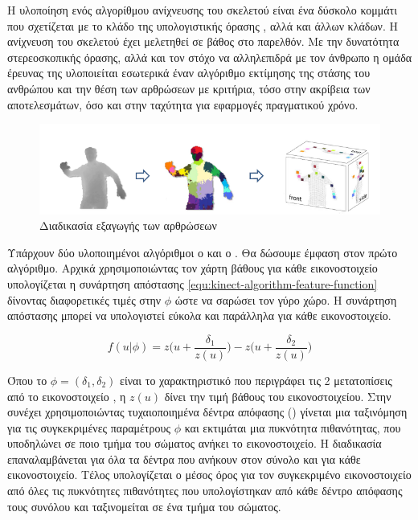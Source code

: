Η υλοποίηση ενός αλγορίθμου ανίχνευσης του σκελετού είναι ένα δύσκολο κομμάτι που σχετίζεται με το κλάδο της υπολογιστικής όρασης \cite{mubarak97}, αλλά και άλλων κλάδων. Η ανίχνευση του σκελετού έχει μελετηθεί σε βάθος \cite{moseslund01, poppe07} στο παρελθόν. Με την δυνατότητα στερεοσκοπικής όρασης, αλλά και τον στόχο να αλληλεπιδρά με τον άνθρωπο η ομάδα έρευνας της  υλοποιείται εσωτερικά έναν αλγόριθμο εκτίμησης της στάσης του ανθρώπου και την θέση των αρθρώσεων \cite{shotton11} με κριτήρια, τόσο στην ακρίβεια των αποτελεσμάτων, όσο και στην ταχύτητα για εφαρμογές πραγματικού χρόνο.

\begin{figure}[H]
    \centering
    \includegraphics[width=.9\textwidth]{fig/kinect-skeleton-algorithm.png}
    \caption{Διαδικασία εξαγωγής των αρθρώσεων \cite{shotton11}}
    \label{fig:kinect-skeleton-algorithm}
\end{figure}

Υπάρχουν δύο υλοποιημένοι αλγόριθμοι ο  και ο . Θα δώσουμε έμφαση στον πρώτο αλγόριθμο. Αρχικά χρησιμοποιώντας τον χάρτη βάθους για κάθε εικονοστοιχείο υπολογίζεται η συνάρτηση απόστασης \ref{equ:kinect-algorithm-feature-function} δίνοντας διαφορετικές τιμές στην $\phi$ ώστε να σαρώσει τον γύρο χώρο. Η συνάρτηση απόστασης μπορεί να υπολογιστεί εύκολα και παράλληλα για κάθε εικονοστοιχείο.

\begin{equation}
    f(u|\phi ) = z\big( u + \frac{\delta_1}{z(u)}\big)-z\big( u + \frac{\delta_2}{z(u)}\big)
    \label{equ:kinect-algorithm-feature-function}
\end{equation}

Όπου το $\phi = (\delta_1, \delta_2)$ είναι το χαρακτηριστικό που περιγράφει τις 2 μετατοπίσεις από το εικονοστοιχείο , η $z(u)$ δίνει την τιμή βάθους του εικονοστοιχείου. Στην συνέχει χρησιμοποιώντας τυχαιοποιημένα δέντρα απόφασης () γίνεται μια ταξινόμηση για τις συγκεκριμένες παραμέτρους $\phi$ και εκτιμάται μια πυκνότητα πιθανότητας, που υποδηλώνει σε ποιο τμήμα του σώματος ανήκει το εικονοστοιχείο. Η διαδικασία επαναλαμβάνεται για όλα τα δέντρα που ανήκουν στον σύνολο και για κάθε εικονοστοιχείο. Τέλος υπολογίζεται ο μέσος όρος για τον συγκεκριμένο εικονοστοιχείο από όλες τις πυκνότητες πιθανότητες που υπολογίστηκαν από κάθε δέντρο απόφασης τους συνόλου και ταξινομείται σε ένα τμήμα του σώματος.

